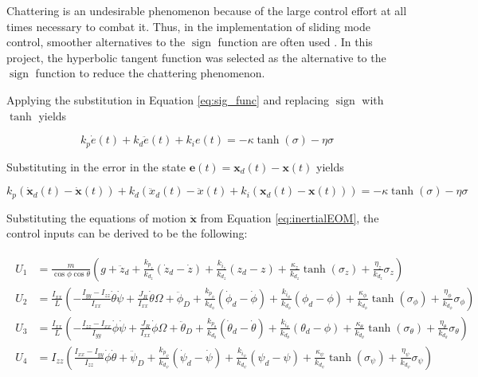 \documentclass[12pt]{article}
\DeclareMathOperator{\sign}{sign}
\begin{document}
Chattering is an undesirable phenomenon because of the large control effort at all times necessary to combat it. Thus, in the implementation of sliding mode control, smoother alternatives to the $\sign$ function are often used \cite{SMCControlObservation}. In this project, the hyperbolic tangent function was selected as the alternative to the $\sign$ function to reduce the chattering phenomenon.

Applying the substitution in Equation \ref{eq:sig_func} and replacing $\sign$ with $\tanh$ yields
\begin{center}
\begin{equation}
k_p\dot{e}(t) + k_d\ddot{e}(t) + k_ie(t) = -\kappa\tanh(\sigma) - \eta\sigma
\end{equation}
\end{center}

Substituting in the error in the state $\bm e(t) = \bm x_d(t) - \bm x(t)$ yields

\begin{equation}
k_p\left(\dot{\bm x}_d(t) - \dot{\bm x}(t)\right) + k_d\left(\ddot{x}_d(t) - \ddot{x}(t) + k_i\left(\bm x_d(t) - \bm x(t)\right)\right) = -\kappa\tanh(\sigma) - \eta\sigma
\end{equation}

Substituting the equations of motion $\ddot{\bm x}$ from Equation \ref{eq:inertialEOM}, the control inputs can be derived to be the following:

\begin{align} \label{eq:U}
\begin{split}
U_1 &= \frac{m}{\cos\phi\cos\theta}\left(g+\ddot{z}_d+\frac{k_{p_z}}{k_{d_z}}(\dot{z}_d-\dot{z})+\frac{k_{i_z}}{k_{d_z}}(z_d-z)+\frac{\kappa_z}{k_{d_z}}\tanh(\sigma_z)+\frac{\eta_z}{k_{d_z}}\sigma_z\right) \\
U_2 &= \frac{I_{xx}}{L}\left(-\frac{I_{yy}-I_{zz}}{I_{xx}}\dot{\theta}\dot{\psi}+\frac{J_R}{I_{xx}}\dot{\theta}\Omega + \ddot{\phi}_D+\frac{k_{p_\phi}}{k_{d_\phi}}(\dot{\phi}_d-\dot{\phi})+\frac{k_{i_\phi}}{k_{d_\phi}}(\phi_d-\phi)+\frac{\kappa_\phi}{k_{d_\phi}}\tanh(\sigma_\phi)+\frac{\eta_\phi}{k_{d_\phi}}\sigma_\phi\right) \\
U_3 &= \frac{I_{xx}}{L}\left(-\frac{I_{zz}-I_{xx}}{I_{yy}}\dot{\phi}\dot{\psi}+\frac{J_R}{I_{xx}}\dot{\phi}\Omega + \ddot{\theta}_D+\frac{k_{p_\theta}}{k_{d_\theta}}(\dot{\theta}_d-\dot{\theta})+\frac{k_{i_\theta}}{k_{d_\theta}}(\theta_d-\phi)+\frac{\kappa_\theta}{k_{d_\theta}}\tanh(\sigma_\theta)+\frac{\eta_\theta}{k_{d_\theta}}\sigma_\theta\right) \\
U_4 &= I_{zz}\left(\frac{I_{xx}-I_{yy}}{I_{zz}}\dot{\phi}\dot{\theta}+\ddot{\psi}_D+\frac{k_{p_\psi}}{k_{d_\psi}}(\dot{\psi}_d-\dot{\psi})+\frac{k_{i_\psi}}{k_{d_\psi}}(\psi_d-\psi)+\frac{\kappa_\psi}{k_{d_\psi}}\tanh(\sigma_\psi)+\frac{\eta_\psi}{k_{d_\psi}}\sigma_\psi\right)
\end{split}
\end{align}
\end{document}
